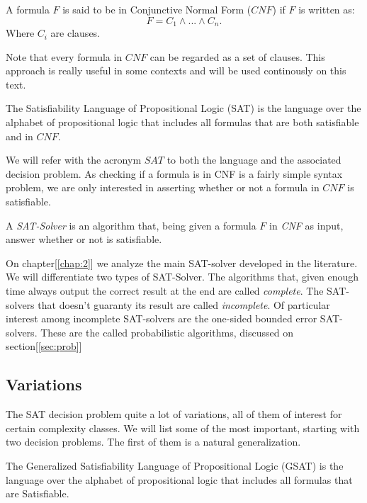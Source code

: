 \begin{definition}
  A formula $F$ is said to be in Conjunctive Normal Form ($CNF$) if $F$ is written as:
  $$F = C_1\wedge ... \wedge C_n.$$
  Where $C_i$  are clauses.
\end{definition}

Note that every formula in $CNF$ can be regarded as a set of clauses. This approach is really useful in some contexts and will be used continously on this text.

\begin{definition}
  The Satisfiability Language of Propositional Logic (SAT) is the language over the alphabet of propositional logic that includes all formulas that are both satisfiable and in $CNF$.
\end{definition}

We will refer with the acronym $SAT$ to both the language and the associated decision problem. As checking if a formula is in CNF is a fairly simple syntax problem, we are only interested in asserting whether or not a formula in $CNF$ is satisfiable.

\begin{definition}
  A \emph{SAT-Solver} is an algorithm that, being given a formula $F$ in \emph{CNF} as input, answer whether or not is satisfiable.
\end{definition}

On chapter[\ref{chap:2}] we analyze the main SAT-solver developed in the literature. We will differentiate two types of SAT-Solver. The algorithms that, given enough time always output the correct result at the end are called \emph{complete}. The SAT-solvers that doesn't guaranty its result are called \emph{incomplete}. Of particular interest among incomplete SAT-solvers are the one-sided bounded error SAT-solvers. These are the called probabilistic algorithms, discussed on section[\ref{sec:prob}]


\subsection{Variations}

The SAT decision problem quite a lot of variations, all of them of interest for certain complexity classes. We will list some of the most important, starting with two decision problems. The first of them is a natural generalization.

\begin{definition}
  The Generalized Satisfiability Language of Propositional Logic (GSAT) is the language over the alphabet of propositional logic that includes all formulas that are Satisfiable.
\end{definition}

